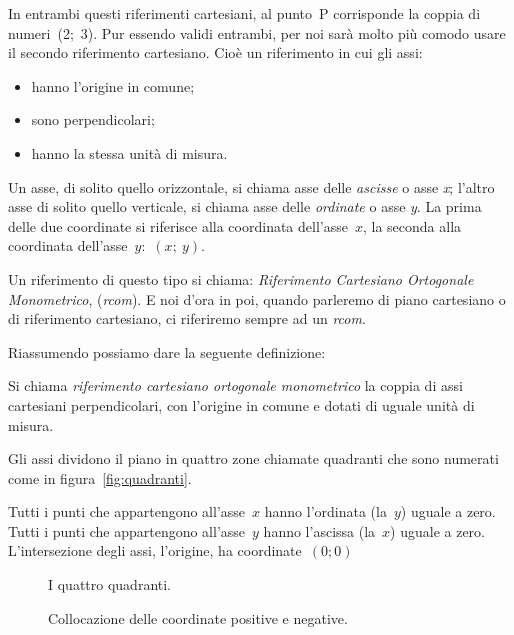 In entrambi questi riferimenti cartesiani, al punto~P corrisponde la coppia
di numeri~(2;~3). Pur essendo validi entrambi, per noi sarà molto più comodo 
usare il secondo riferimento cartesiano. Cioè un riferimento in cui gli assi:

\begin{itemize} [noitemsep]
 \item hanno l'origine in comune;
 \item sono perpendicolari;
 \item hanno la stessa unità di misura.
\end{itemize}

Un asse, di solito quello orizzontale, si chiama asse delle \emph{ascisse} 
o asse \emph{x}; l'altro asse di solito quello verticale, si chiama asse 
delle \emph{ordinate} o asse \emph{y}. La prima delle due coordinate
si riferisce alla coordinata dell'asse~\(x\), la seconda alla coordinata 
dell'asse~\(y\):~\((x;~y)\).

Un riferimento di questo tipo si chiama: 
\emph{Riferimento Cartesiano Ortogonale Monometrico}, (\emph{rcom}). 
E noi d'ora in poi, quando parleremo di piano cartesiano o di riferimento 
cartesiano, ci riferiremo sempre ad un \emph{rcom}.

Riassumendo possiamo dare la seguente definizione:

\begin{definizione}
Si chiama \emph{riferimento cartesiano ortogonale monometrico} 
la coppia di assi cartesiani perpendicolari, con l'origine in comune e 
dotati di uguale unità di misura.
\end{definizione}

Gli assi dividono il piano in quattro zone chiamate quadranti che sono 
numerati come in figura~\ref{fig:quadranti}.

Tutti i punti che appartengono all'asse~\(x\) hanno l'ordinata (la~\(y\)) 
uguale 
a zero.
Tutti i punti che appartengono all'asse~\(y\) hanno l'ascissa (la~\(x\)) uguale 
a zero.
L'intersezione degli assi, l'origine, ha coordinate~\((0; 0)\)

\begin{inaccessibleblock}
 \begin{figure}[h]
 \centering
 \begin{minipage}[t]{.45\textwidth}
 \centering \pianoconquadranti
 \caption{I quattro quadranti.}\label{fig:quadranti}
 \end{minipage}\hfil
 \begin{minipage}[t]{.45\textwidth}
 \centering \pianoconsegni
 \caption{Collocazione delle coordinate positive e negative.}
 \label{fig:segni}
 \end{minipage}
\end{figure}
\end{inaccessibleblock}

